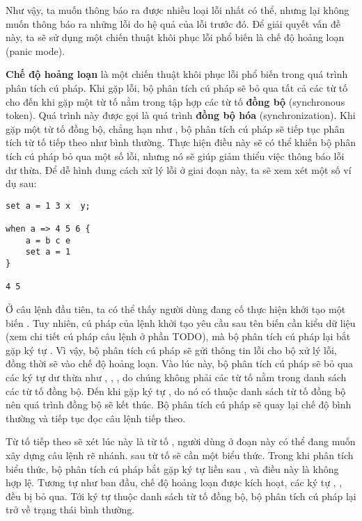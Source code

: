     Như vậy, ta muốn thông báo ra được nhiều loại lỗi nhất có thể, nhưng lại không muốn thông báo ra những lỗi do hệ quả của lỗi trước đó. Để giải quyết vấn đề này, ta sẽ sử dụng một chiến thuật khôi phục lỗi phổ biến là chế độ hoảng loạn (panic mode). 

    \textbf{Chế độ hoảng loạn} là một chiến thuật khôi phục lỗi phổ biến trong quá trình phân tích cú pháp. Khi gặp lỗi, bộ phân tích cú pháp sẽ bỏ qua tất cả các từ tố cho đến khi gặp một từ tố nằm trong tập hợp các từ tố \textbf{đồng bộ} (synchronous token). Quá trình này được gọi là quá trình \textbf{đồng bộ hóa} (synchronization). Khi gặp một từ tố đồng bộ, chẳng hạn như \kw{;}, bộ phân tích cú pháp sẽ tiếp tục phân tích từ tố tiếp theo như bình thường. Thực hiện điều này sẽ có thể khiến bộ phân tích cú pháp bỏ qua một số lỗi, nhưng nó sẽ giúp giảm thiểu việc thông báo lỗi dư thừa. Để dễ hình dung cách xử lý lỗi ở giai đoạn này, ta sẽ xem xét một số ví dụ sau:

\begin{lstlisting}[]
set a = 1 3 x  y;

when a => 4 5 6 {
    a = b c e
    set a = 1
}

4 5
\end{lstlisting}

    Ở câu lệnh đầu tiên, ta có thể thấy người dùng đang cố thực hiện khởi tạo một biến . Tuy nhiên, cú pháp của lệnh khởi tạo yêu cầu sau tên biến cần kiểu dữ liệu (xem chi tiết cú pháp câu lệnh ở phần TODO), mà bộ phân tích cú pháp lại bắt gặp ký tự \kw{=}. Vì vậy, bộ phân tích cú pháp sẽ gửi thông tin lỗi cho bộ xử lý lỗi, đồng thời sẽ vào chế độ hoảng loạn. Vào lúc này, bộ phân tích cú pháp sẽ bỏ qua các ký tự dư thừa như , , ,  do chúng không phải các từ tố nằm trong danh sách các từ tố đồng bộ. Đến khi gặp ký tự \kw{;}, do nó có thuộc danh sách từ tố đồng bộ nên quá trình đồng bộ sẽ kết thúc. Bộ phân tích cú pháp sẽ quay lại chế độ bình thường và tiếp tục đọc câu lệnh tiếp theo. 

Từ tố tiếp theo sẽ xét lúc này là từ tố , người dùng ở đoạn này có thể đang muốn xây dựng câu lệnh rẽ nhánh. sau từ tố  sẽ cần một biểu thức. Trong khi phân tích biểu thức, bộ phân tích cú pháp bắt gặp ký tự \kw{>} liền sau \kw{=}, và điều này là không hợp lệ. Tương tự như ban đầu, chế độ hoảng loạn được kích hoạt, các ký tự , ,  đều bị bỏ qua. Tới ký tự \kw{\{} thuộc danh sách từ tố đồng bộ, bộ phân tích cú pháp lại trở về trạng thái bình thường.

